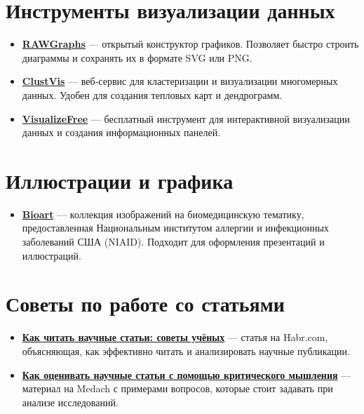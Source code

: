 \documentclass[
  russian,
  letterpaper,
]{book}
\providecommand{\tightlist}{%
  \setlength{\itemsep}{0pt}\setlength{\parskip}{0pt}}
\begin{document}
\chapter{Инструменты визуализации
данных}\label{ux438ux43dux441ux442ux440ux443ux43cux435ux43dux442ux44b-ux432ux438ux437ux443ux430ux43bux438ux437ux430ux446ux438ux438-ux434ux430ux43dux43dux44bux445}

\begin{itemize}
\tightlist
\item
  \href{https://rawgraphs.io}{\textbf{RAWGraphs}} --- открытый
  конструктор графиков. Позволяет быстро строить диаграммы и сохранять
  их в формате SVG или PNG.
\item
  \href{https://biit.cs.ut.ee/clustvis/}{\textbf{ClustVis}} ---
  веб‑сервис для кластеризации и визуализации многомерных данных. Удобен
  для создания тепловых карт и дендрограмм.
\item
  \href{https://visualizefree.com}{\textbf{VisualizeFree}} ---
  бесплатный инструмент для интерактивной визуализации данных и создания
  информационных панелей.
\end{itemize}

\chapter{Иллюстрации и
графика}\label{ux438ux43bux43bux44eux441ux442ux440ux430ux446ux438ux438-ux438-ux433ux440ux430ux444ux438ux43aux430}

\begin{itemize}
\tightlist
\item
  \href{https://www.flickr.com/photos/niaid/}{\textbf{Bioart}} ---
  коллекция изображений на биомедицинскую тематику, предоставленная
  Национальным институтом аллергии и инфекционных заболеваний США
  (NIAID). Подходит для оформления презентаций и иллюстраций.
\end{itemize}

\chapter{Советы по работе со
статьями}\label{ux441ux43eux432ux435ux442ux44b-ux43fux43e-ux440ux430ux431ux43eux442ux435-ux441ux43e-ux441ux442ux430ux442ux44cux44fux43cux438}

\begin{itemize}
\item
  \href{https://habr.com/ru/post/example/}{\textbf{Как читать научные
  статьи: советы учёных}} --- статья на Habr.com, объясняющая, как
  эффективно читать и анализировать научные публикации.
\item
  \href{https://medach.pro/post/example}{\textbf{Как оценивать научные
  статьи с помощью критического мышления}} --- материал на Medach с
  примерами вопросов, которые стоит задавать при анализе исследований.
\end{itemize}
\end{document}
